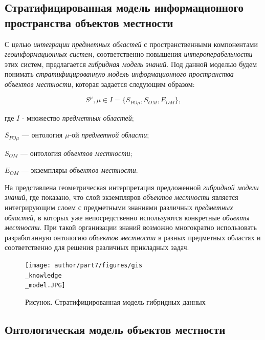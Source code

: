 \subsection{Стратифицированная модель информационного пространства объектов местности}
\label{chapter_gis_sec_strat_model}

С целью \textit{интеграции} \textit{предметных областей} с пространственными компонентами \textit{геоинформационных систем}, соответственно повышения \textit{интероперабельности} этих систем, предлагается \textit{гибридная модель знаний}. Под данной моделью будем понимать \textit{стратифицированную модель информационного пространства объектов местности}, которая задается следующим образом:

\begin{equation} 
\label{<eq2_1>} 
S^{\mu}, \mu  \in I = \{S_{PO\mu}, S_{OM}, E_{OM}\},
\end{equation} 

\parindent=8mm
\noindent \hangindent=22mm 
где $I$ - множество \textit{предметных областей};

\hangindent=22mm 
$S_{PO\mu}$ --- онтология ${\mu}$-ой \textit{предметной области};

\hangindent=30mm 
$S_{OM}$ --- онтология \textit{объектов местности};

\hangindent=30mm 
$E_{OM}$ --- экземпляры \textit{объектов местности}.

На  представлена геометрическая интерпретация предложенной \textit{гибридной модели знаний}, где показано, что слой экземпляров \textit{объектов местности} является интегрирующим слоем с предметными знаниями различных \textit{предметных областей}, в которых уже непосредственно используются конкретные \textit{объекты местности}. При такой организации знаний возможно многократно использовать  разработанную онтологию \textit{объектов местности} в разных предметных областях и соответственно для решения различных прикладных задач.

\begin{figure}[H]
	\center
	\caption{Рисунок. Стратифицированная модель гибридных данных}
	\texttt{[image: author/part7/figures/gis\\\_knowledge\\\_model.JPG]}
	\label{fig:pic2_1}
\end{figure}

\subsection{Онтологическая модель объектов местности}
\label{chapter_gis_sec_onto_model}

